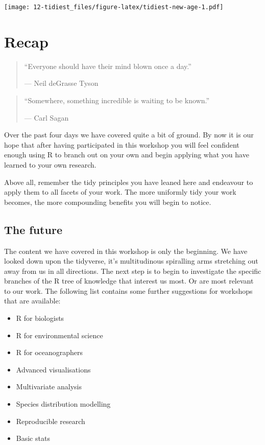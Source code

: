 \documentclass[]{book}
\providecommand{\tightlist}{%
  \setlength{\itemsep}{0pt}\setlength{\parskip}{0pt}}
\theoremstyle{definition}
\theoremstyle{definition}
\theoremstyle{definition}
\theoremstyle{remark}
\begin{document}
\texttt{[image: 12-tidiest\_files/figure-latex/tidiest-new-age-1.pdf]}

\chapter{Recap}\label{recap}

\begin{quote}
``Everyone should have their mind blown once a day.''

--- Neil deGrasse Tyson
\end{quote}

\begin{quote}
``Somewhere, something incredible is waiting to be known.''

--- Carl Sagan
\end{quote}

Over the past four days we have covered quite a bit of ground. By now it
is our hope that after having participated in this workshop you will
feel confident enough using R to branch out on your own and begin
applying what you have learned to your own research.

Above all, remember the tidy principles you have leaned here and
endeavour to apply them to all facets of your work. The more uniformly
tidy your work becomes, the more compounding benefits you will begin to
notice.

\section{The future}\label{the-future}

The content we have covered in this workshop is only the beginning. We
have looked down upon the tidyverse, it's multitudinous spiralling arms
stretching out away from us in all directions. The next step is to begin
to investigate the specific branches of the R tree of knowledge that
interest us most. Or are most relevant to our work. The following list
contains some further suggestions for workshops that are available:

\begin{itemize}
\tightlist
\item
  R for biologists
\item
  R for environmental science
\item
  R for oceanographers
\item
  Advanced visualisations
\item
  Multivariate analysis
\item
  Species distribution modelling
\item
  Reproducible research
\item
  Basic stats
\end{itemize}
\end{document}

